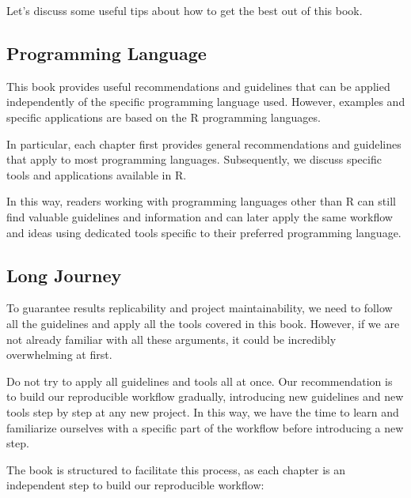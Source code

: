 \documentclass[
  11pt,
]{book}
\begin{document}
Let's discuss some useful tips about how to get the best out of this book.

\hypertarget{programming-language}{%
\subsection{Programming Language}\label{programming-language}}

This book provides useful recommendations and guidelines that can be applied independently of the specific programming language used. However, examples and specific applications are based on the R programming languages.

In particular, each chapter first provides general recommendations and guidelines that apply to most programming languages. Subsequently, we discuss specific tools and applications available in R.

In this way, readers working with programming languages other than R can still find valuable guidelines and information and can later apply the same workflow and ideas using dedicated tools specific to their preferred programming language.

\hypertarget{long-journey}{%
\subsection{Long Journey}\label{long-journey}}

To guarantee results replicability and project maintainability, we need to follow all the guidelines and apply all the tools covered in this book. However, if we are not already familiar with all these arguments, it could be incredibly overwhelming at first.

Do not try to apply all guidelines and tools all at once. Our recommendation is to build our reproducible workflow gradually, introducing new guidelines and new tools step by step at any new project. In this way, we have the time to learn and familiarize ourselves with a specific part of the workflow before introducing a new step.

The book is structured to facilitate this process, as each chapter is an independent step to build our reproducible workflow:
\end{document}
